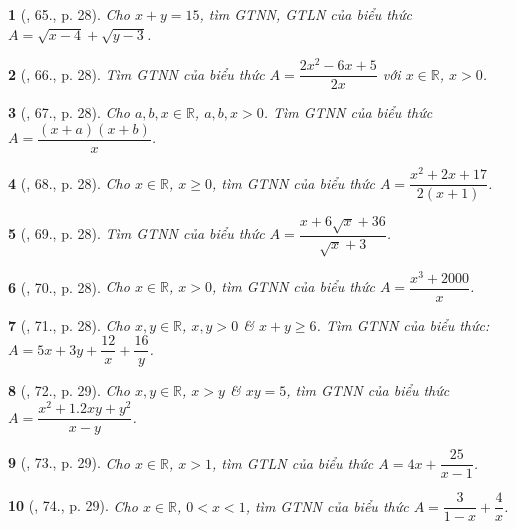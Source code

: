 \documentclass{article}
\newtheorem{baitoan}{}
\begin{document}
\begin{baitoan}[\cite{Tuyen_Toan_9_old}, 65., p. 28]
	Cho $x + y = 15$, tìm {\rm GTNN}, {\rm GTLN} của biểu thức $A = \sqrt{x - 4} + \sqrt{y - 3}$.
\end{baitoan}

\begin{baitoan}[\cite{Tuyen_Toan_9_old}, 66., p. 28]
	Tìm {\rm GTNN} của biểu thức $A = \dfrac{2x^2 - 6x + 5}{2x}$ với $x\in\mathbb{R}$, $x > 0$.
\end{baitoan}

\begin{baitoan}[\cite{Tuyen_Toan_9_old}, 67., p. 28]
	Cho $a,b,x\in\mathbb{R}$, $a,b,x > 0$. Tìm {\rm GTNN} của biểu thức $A = \dfrac{(x + a)(x + b)}{x}$.
\end{baitoan}

\begin{baitoan}[\cite{Tuyen_Toan_9_old}, 68., p. 28]
	Cho $x\in\mathbb{R}$, $x\ge0$, tìm {\rm GTNN} của biểu thức $A = \dfrac{x^2 + 2x + 17}{2(x + 1)}$.
\end{baitoan}

\begin{baitoan}[\cite{Tuyen_Toan_9_old}, 69., p. 28]
	Tìm {\rm GTNN} của biểu thức $A = \dfrac{x + 6\sqrt{x} + 36}{\sqrt{x} + 3}$.
\end{baitoan}

\begin{baitoan}[\cite{Tuyen_Toan_9_old}, 70., p. 28]
	Cho $x\in\mathbb{R}$, $x > 0$, tìm {\rm GTNN} của biểu thức $A = \dfrac{x^3 + 2000}{x}$.
\end{baitoan}

\begin{baitoan}[\cite{Tuyen_Toan_9_old}, 71., p. 28]
	Cho $x,y\in\mathbb{R}$, $x,y > 0$ \& $x + y\ge6$. Tìm {\rm GTNN} của biểu thức: $A = 5x + 3y + \dfrac{12}{x} + \dfrac{16}{y}$.
\end{baitoan}

\begin{baitoan}[\cite{Tuyen_Toan_9_old}, 72., p. 29]
	Cho $x,y\in\mathbb{R}$, $x > y$ \& $xy = 5$, tìm {\rm GTNN} của biểu thức $A = \dfrac{x^2 + 1.2xy + y^2}{x - y}$.
\end{baitoan}

\begin{baitoan}[\cite{Tuyen_Toan_9_old}, 73., p. 29]
	Cho $x\in\mathbb{R}$, $x > 1$, tìm {\rm GTLN} của biểu thức $A = 4x + \dfrac{25}{x - 1}$.
\end{baitoan}

\begin{baitoan}[\cite{Tuyen_Toan_9_old}, 74., p. 29]
	Cho $x\in\mathbb{R}$, $0 < x < 1$, tìm {\rm GTNN} của biểu thức $A = \dfrac{3}{1 - x} + \dfrac{4}{x}$.
\end{baitoan}
\end{document}
